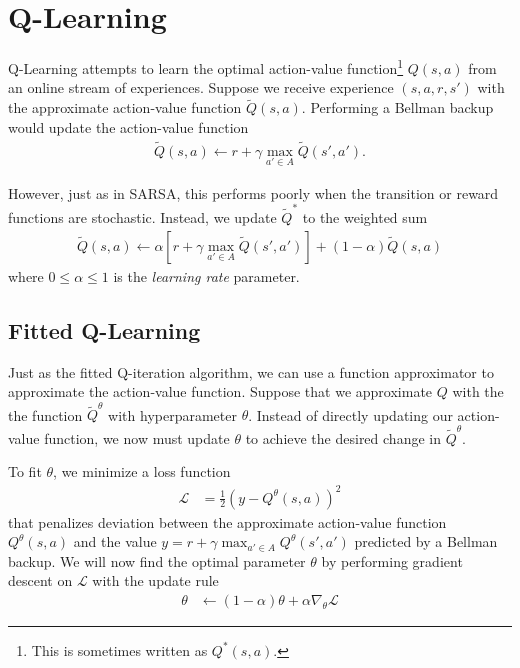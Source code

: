 \documentclass[11pt]{article}
\numberwithin{equation}{section}
\numberwithin{figure}{section}
\begin{document}
\section{Q-Learning}
Q-Learning attempts to learn the optimal action-value function\footnote{This is
sometimes written as $Q^*(s, a)$.} $Q(s, a)$ from an online stream of
experiences. Suppose we receive experience $(s, a, r, s')$ with the approximate
action-value function $\tilde{Q}(s, a)$. Performing a Bellman backup would
update the action-value function
\begin{align*}
    \tilde{Q}(s, a) \gets r + \gamma \max_{a' \in A} \tilde{Q}(s', a').
\end{align*}

However, just as in SARSA, this performs poorly when the transition or reward
functions are stochastic. Instead, we update $\tilde{Q}^*$ to the weighted sum
\begin{align*}
    \tilde{Q}(s, a) \gets \alpha \left[r + \gamma \max_{a' \in A} \tilde{Q}(s', a')\right]
                          + (1 - \alpha) \tilde{Q}(s, a)
\end{align*}
where $0 \le \alpha \le 1$ is the \emph{learning rate} parameter.

\subsection{Fitted Q-Learning}
Just as the fitted Q-iteration algorithm, we can use a function approximator to
approximate the action-value function. Suppose that we approximate $Q$ with the
the function $\tilde{Q}^\theta$ with hyperparameter $\theta$. Instead of
directly updating our action-value function, we now must update $\theta$ to
achieve the desired change in $\tilde{Q}^\theta$.

To fit $\theta$, we minimize a loss function
\begin{align*}
    \mathcal{L} &= \frac{1}{2} \left( y - Q^\theta(s, a) \right)^2
\end{align*}
that penalizes deviation between the approximate action-value function
$Q^\theta(s, a)$ and the value $y = r + \gamma \max_{a' \in A} Q^\theta(s',
a')$ predicted by a Bellman backup. We will now find the optimal parameter
$\theta$ by performing gradient descent on $\mathcal{L}$ with the update rule
\begin{align}
    \theta &\gets (1 - \alpha) \theta + \alpha \nabla_\theta \mathcal{L}
    \label{eqn:qlearning-step}
\end{align}
\end{document}
